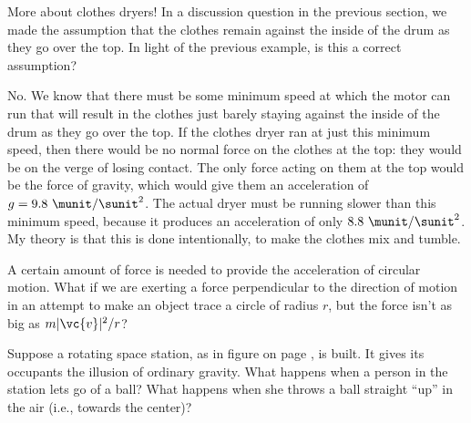 \begin{eg}{More about clothes dryers!}
\egquestion In a discussion question in the previous section,
we made the assumption that the clothes remain against the
inside of the drum as they go over the top. In light of the
previous example, is this a correct assumption?

\eganswer No. We know that there must be some minimum speed
at which the motor can run that will result in the clothes
just barely staying against the inside of the drum as they
go over the top. If the clothes dryer ran at just this
minimum speed, then there would be no normal force on the
clothes at the top: they would be on the verge of losing
contact. The only force acting on them at the top would be
the force of gravity, which would give them an acceleration
of $g=9.8\ \munit/\sunit^2$. The actual dryer must be running slower
than this minimum speed, because it produces an acceleration
of only $8.8\ \munit/\sunit^2$. My theory is that this is done
intentionally, to make the clothes mix and tumble.
\end{eg}



\startdqs

\begin{dq}
A certain amount of force is needed to provide the
acceleration of circular motion. What if we are exerting a
force perpendicular to the direction of motion in an attempt
to make an object trace a circle of radius $r$, but the
force isn't as big as $m|\vc{v}|^2/r$?
\end{dq}

\begin{dq}\label{dq:space-colony}
Suppose a rotating space station, as in figure
 on page \pageref{fig:space-colony}, is built. It
gives its
occupants the illusion of ordinary gravity. What happens
when a person in the station lets go of a ball? What happens
when she throws a ball straight ``up'' in the air (i.e.,
towards the center)?
\end{dq}

